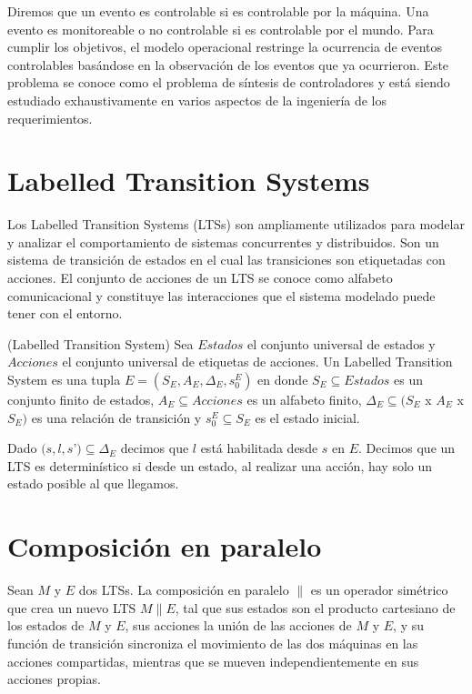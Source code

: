 \vspace{\baselineskip}
Diremos que un evento es controlable si es controlable por la máquina. Una evento es monitoreable o no controlable si es
controlable por el mundo. 
Para cumplir los objetivos, el modelo operacional restringe la ocurrencia de eventos controlables basándose en la observación
de los eventos que ya ocurrieron.
Este problema se conoce como el problema de síntesis de controladores y está siendo estudiado exhaustivamente en varios
aspectos de la ingeniería de los requerimientos.

\section{Labelled Transition Systems}
Los Labelled Transition Systems \cite{LTS} (LTSs) son ampliamente utilizados para modelar y analizar el comportamiento de sistemas
concurrentes y distribuidos. Son un sistema de transición de estados en el cual las transiciones son etiquetadas con
acciones. El conjunto de acciones de un LTS se conoce como alfabeto comunicacional y constituye las interacciones que
el sistema modelado puede tener con el entorno.

\begin{definition}{(Labelled Transition System)}
Sea $Estados$ el conjunto universal de estados y $Acciones$ el conjunto universal de etiquetas de acciones. Un Labelled
Transition System es una tupla $E = (S_{E}, A_{E}, \Delta_{E}, s_{0}^{E})$ en donde $S_{E} \subseteq Estados$ es un conjunto
finito de estados, $A_{E} \subseteq Acciones$ es un alfabeto finito, $\Delta_{E} \subseteq (S_{E}$ x $A_{E}$ x $S_{E})$ es una
relación de transición y $s_{0}^{E} \subseteq S_{E}$ es el estado inicial.
\end{definition}

Dado $(s, l, s$’$) \subseteq \Delta_{E}$ decimos que $l$ está habilitada desde $s$ en $E$. Decimos que un LTS es
determinístico si desde un estado, al realizar una acción, hay solo un estado posible al que llegamos.

\section{Composición en paralelo}

Sean $M$ y $E$ dos LTSs. La composición en paralelo $\parallel$ es un operador simétrico que crea un nuevo LTS $M \parallel E$, 
tal que sus estados son el producto cartesiano de los estados de $M$ y $E$, sus acciones la unión de las acciones de $M$ y $E$, 
y su función de transición sincroniza el movimiento de las dos máquinas en las acciones compartidas, mientras que se 
mueven independientemente en sus acciones propias.

